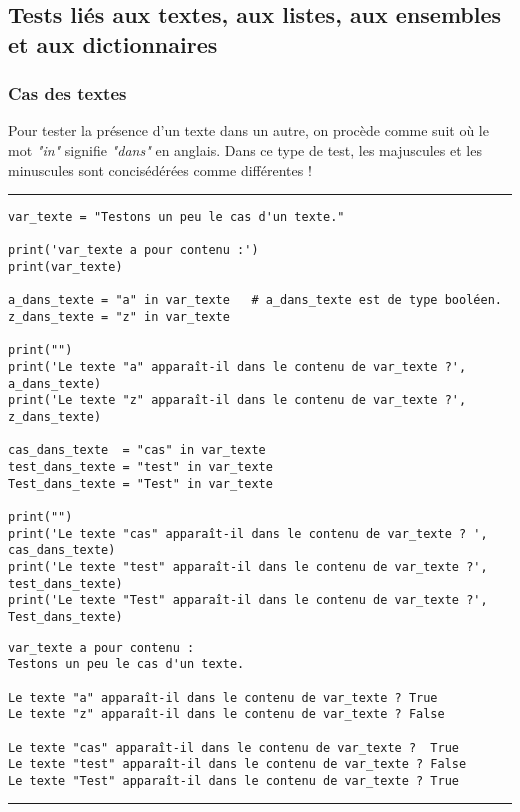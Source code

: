 \subsection{Tests liés aux textes, aux listes, aux ensembles et aux dictionnaires}

\subsubsection{Cas des textes}

Pour tester la présence d'un texte dans un autre, on procède comme suit où le mot \textit{"in"} signifie \textit{"dans"} en anglais. Dans ce type de test, les majuscules et les minuscules sont concisédérées comme différentes !


\newpage

\bigskip
{\hrule height .5mm}
\begin{verbatim}
var_texte = "Testons un peu le cas d'un texte."

print('var_texte a pour contenu :')
print(var_texte)

a_dans_texte = "a" in var_texte   # a_dans_texte est de type booléen.
z_dans_texte = "z" in var_texte

print("")
print('Le texte "a" apparaît-il dans le contenu de var_texte ?', a_dans_texte)
print('Le texte "z" apparaît-il dans le contenu de var_texte ?', z_dans_texte)

cas_dans_texte  = "cas" in var_texte
test_dans_texte = "test" in var_texte
Test_dans_texte = "Test" in var_texte

print("")
print('Le texte "cas" apparaît-il dans le contenu de var_texte ? ', cas_dans_texte)
print('Le texte "test" apparaît-il dans le contenu de var_texte ?', test_dans_texte)
print('Le texte "Test" apparaît-il dans le contenu de var_texte ?', Test_dans_texte)
\end{verbatim}
 \color{ForestGreen}
\vspace{-1.5em}
\begin{verbatim}
var_texte a pour contenu :
Testons un peu le cas d'un texte.

Le texte "a" apparaît-il dans le contenu de var_texte ? True
Le texte "z" apparaît-il dans le contenu de var_texte ? False

Le texte "cas" apparaît-il dans le contenu de var_texte ?  True
Le texte "test" apparaît-il dans le contenu de var_texte ? False
Le texte "Test" apparaît-il dans le contenu de var_texte ? True
\end{verbatim} \color{Black}
{\hrule height .5mm}
\bigskip


